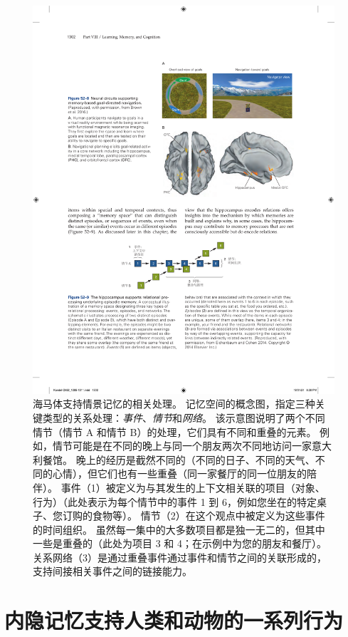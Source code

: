 \begin{figure}[htbp]
	\centering
	\includegraphics[width=0.8\linewidth]{chap52/fig_52_9}
	\caption{海马体支持情景记忆的相关处理。
		记忆空间的概念图，指定三种关键类型的关系处理：\textit{事件}、\textit{情节}和\textit{网络}。
		该示意图说明了两个不同情节（情节 A 和情节 B）的处理，它们具有不同和重叠的元素。
		例如，情节可能是在不同的晚上与同一个朋友两次不同地访问一家意大利餐馆。
		晚上的经历是截然不同的（不同的日子、不同的天气、不同的心情），但它们也有一些重叠（同一家餐厅的同一位朋友的陪伴）。
		事件（1）被定义为与其发生的上下文相关联的项目（对象、行为）（此处表示为每个情节中的事件 1 到 6，例如您坐在的特定桌子、您订购的食物等）。
		情节（2）在这个观点中被定义为这些事件的时间组织。 虽然每一集中的大多数项目都是独一无二的，但其中一些是重叠的（此处为项目 3 和 4；在示例中为您的朋友和餐厅）。
		关系网络（3）是通过重叠事件通过事件和情节之间的关联形成的，支持间接相关事件之间的链接能力\cite{eichenbaum2014can}。 }
	\label{fig:52_9}
\end{figure}



\section{内隐记忆支持人类和动物的一系列行为}

